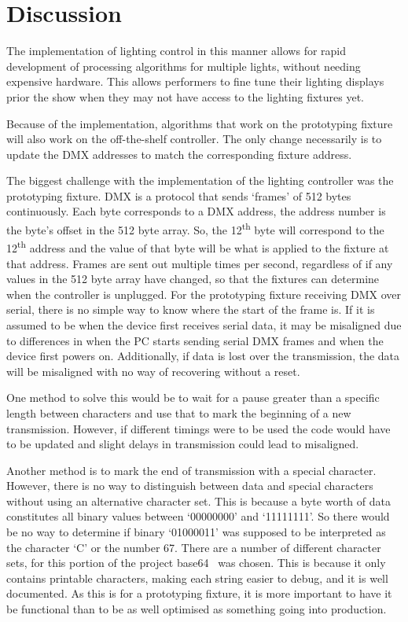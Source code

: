 \section{Discussion}
The implementation of lighting control in this manner allows for rapid development of processing algorithms for multiple lights,
without needing expensive hardware.
This allows performers to fine tune their lighting displays prior the show when they may not have access to the lighting fixtures yet.

Because of the implementation, algorithms that work on the prototyping fixture will also work on the off-the-shelf controller.
The only change necessarily is to update the DMX addresses to match the corresponding fixture address.

The biggest challenge with the implementation of the lighting controller was the prototyping fixture.
DMX is a protocol that sends `frames' of 512 bytes continuously.
Each byte corresponds to a DMX address, the address number is the byte's offset in the 512 byte array.
So, the 12\textsuperscript{th} byte will correspond to the 12\textsuperscript{th} address
and the value of that byte will be what is applied to the fixture at that address.
Frames are sent out multiple times per second, regardless of if any values in the 512 byte array have changed,
so that the fixtures can determine when the controller is unplugged.
For the prototyping fixture receiving DMX over serial, there is no simple way to know where the start of the frame is.
If it is assumed to be when the device first receives serial data,
it may be misaligned due to differences in when the PC starts sending serial DMX frames and when the device first powers on.
Additionally, if data is lost over the transmission, the data will be misaligned with no way of recovering without a reset.

One method to solve this would be to wait for a pause greater than a specific length between characters
and use that to mark the beginning of a new transmission.
However, if different timings were to be used the code would have to be updated and slight delays in transmission could lead to misaligned.

Another method is to mark the end of transmission with a special character.
However, there is no way to distinguish between data and special characters without using an alternative character set.
This is because a byte worth of data constitutes all binary values between `00000000' and `11111111'.
So there would be no way to determine if binary `01000011' was supposed to be interpreted as the character `C' or the number 67.
There are a number of different character sets, for this portion of the project base64~\cite{Sumartono:2016} was chosen.
This is because it only contains printable characters, making each string easier to debug, and it is well documented.
As this is for a prototyping fixture, it is more important to have it be functional than to be as well optimised as something going into production.

